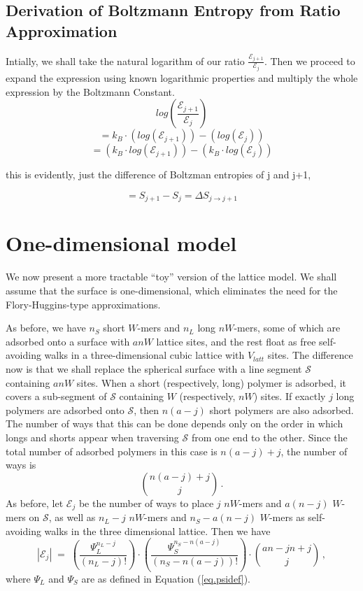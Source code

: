 \documentclass[journal=mamobx,manuscript=article]{achemso}
\begin{document}
\subsection{Derivation of Boltzmann Entropy from Ratio Approximation}

Intially, we shall take the natural logarithm of our ratio $\frac{\mathcal{E}_{j+1}}{\mathcal{E}_{j}}$. Then we proceed to expand the expression using known logarithmic properties and multiply the whole expression by the Boltzmann Constant.
$$log\left(\frac{\mathcal{E}_{j+1}}{\mathcal{E}_{j}}\right)$$
$$=k_B\cdot\left(log\left(\mathcal{E}_{j+1}\right)\right)-\left(log\left(\mathcal{E}_{j}\right)\right)$$
$$= \left(k_B\cdot log\left(\mathcal{E}_{j+1}\right)\right)-\left(k_B\cdot log\left(\mathcal{E}_{j}\right)\right)$$

\noindent this is evidently, just the difference of Boltzman entropies of j and j+1,

$$=S_{j+1}-S_{j}=\Delta S_{j\to j+1}$$



\section{One-dimensional model}

We now present a more tractable ``toy'' version of the lattice model.  We shall assume that 
the surface is one-dimensional, which eliminates the need for the Flory-Huggins-type approximations.

As before, we have $n_S$ short $W$-mers and $n_L$ long $nW$-mers, some of which are adsorbed 
onto a surface with $anW$ lattice sites, and the rest float as free self-avoiding walks 
in a three-dimensional cubic lattice with  $V_{latt}$ sites.  
The difference now is that we shall replace the spherical surface with a line segment
$\mathcal{S}$ containing $anW$ sites.  When a short (respectively, long) polymer is adsorbed, it covers a 
sub-segment of $\mathcal{S}$ containing $W$ (respectively, $nW$) sites.
If exactly $j$ long polymers are adsorbed onto $\mathcal{S}$, then $n(a-j)$ short polymers are
also adsorbed.  The number of ways that this can be done depends only on the order in which 
longs and shorts appear when traversing $\mathcal{S}$ from one end to the other.  Since the total 
number of adsorbed polymers in this case is $n(a-j)+j$, the number of ways is 
\[      \binom{n(a-j)+j}{j}   \,.  \]
As before, let $\mathcal{E}_j$ be the number of ways to place $j$ $nW$-mers and $a(n-j)$ $W$-mers on 
$\mathcal{S}$, as well as $n_L-j$ $nW$-mers and $n_S-a(n-j)$ $W$-mers as self-avoiding walks 
in the three dimensional lattice.  Then we have 
\begin{equation}
   \label{eq.1dE}
    |\mathcal{E}_j| \;=\;  \left(\frac{\Psi_L^{n_{L}-j}}{(n_L-j)!}\right)\cdot\left(\frac{\Psi_S^{n_S-n(a-j)}}{
    (n_S-n(a-j))!}\right) \cdot\binom{an-jn+j}{j}   \,,
\end{equation}
where 
$\Psi_L$ and $\Psi_S$ are as defined in Equation (\ref{eq.psidef}).
\end{document}
